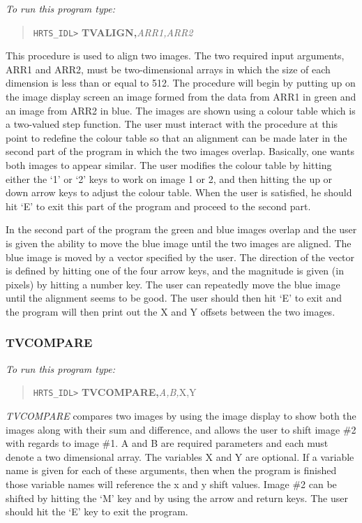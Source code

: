 {\em To run this program type:}
\begin{quote}   
     {\tt HRTS\_IDL>} {\bf TVALIGN,}{\it ARR1,ARR2}      
\end{quote}   
      
This procedure is used to align two images.  The two required input arguments,
ARR1 and ARR2, must be two-dimensional arrays in which the size of each
dimension is less than or equal to 512. The procedure will begin by putting up
on the image display screen an  image formed from the data from ARR1 in green
and an image from ARR2 in blue. The images are shown using a colour table which
is a two-valued step function.  The user must interact with the procedure at
this point to redefine the colour table so that an alignment can be made later
in the second part of the program in which the two images overlap.  Basically,
one wants both images to appear similar.  The user modifies the colour table by
hitting either the `1' or `2' keys to work on image 1 or 2, and then hitting
the up or down arrow keys to adjust the colour table. When the user is
satisfied, he should hit `E' to exit this part of the program and proceed to
the second part.

In the second part of the program the green and blue images overlap and the
user is given the ability to move the blue image until the two images are
aligned.  The blue image is moved by a vector specified by the user.  The
direction of the vector is defined by hitting one of the four arrow keys, and
the magnitude is given (in pixels) by hitting a number key.  The user can
repeatedly move the blue image until the alignment seems to be good.  The user
should then hit `E' to exit and the program will then print out the X and Y
offsets between the two images.

\subsubsection{TVCOMPARE}

{\em To run this program type:}
\begin{quote}   
     {\tt HRTS\_IDL>} {\bf TVCOMPARE,}{\it A,B,}X,Y          
\end{quote}   

{\em TVCOMPARE} compares two images by using the image display to show both the
images along with their sum and difference, and allows the user to shift image
\#2 with regards to image \#1. A and B are required parameters and each must
denote a two dimensional array. The variables X and Y are optional. If a
variable name is given for each of these arguments, then when the program is
finished those variable names will reference the x and y shift values.  Image
\#2 can be shifted by hitting the `M' key and by using the arrow and return
keys. The user should hit the `E' key to exit the program.

